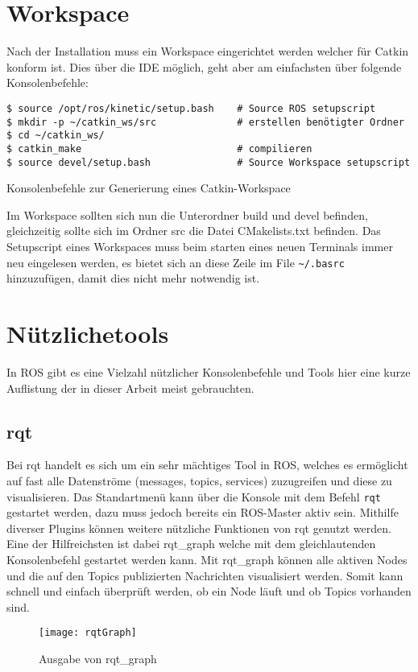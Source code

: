 \section{Workspace}
Nach der Installation muss ein Workspace eingerichtet werden welcher für Catkin konform ist. Dies über die \gls{IDE} möglich, geht aber am einfachsten über folgende Konsolenbefehle:
\begin{code}
	\begin{verbatim}
$ source /opt/ros/kinetic/setup.bash	# Source ROS setupscript
$ mkdir -p ~/catkin_ws/src				# erstellen benötigter Ordner	
$ cd ~/catkin_ws/
$ catkin_make							# compilieren
$ source devel/setup.bash				# Source Workspace setupscript
	\end{verbatim}
	\vspace{-15pt}
	\caption{Konsolenbefehle zur Generierung eines Catkin-Workspace}
	\label{code:catkinWS}
\end{code}
Im Workspace sollten sich nun die Unterordner build und devel befinden, gleichzeitig sollte sich im Ordner src die Datei CMakelists.txt befinden.
Das Setupscript eines Workspaces muss beim starten eines neuen Terminals immer neu eingelesen werden, es bietet sich an diese Zeile im File \verb|~/.basrc| hinzuzufügen, damit dies nicht mehr notwendig ist. 

\section{Nützlichetools}
In ROS gibt es eine Vielzahl nützlicher Konsolenbefehle und Tools hier eine kurze Auflistung der in dieser Arbeit meist gebrauchten.

\subsection{rqt}
Bei rqt handelt es sich um ein sehr mächtiges Tool in ROS, welches es ermöglicht auf fast alle Datenströme (messages, topics, services) zuzugreifen und diese zu visualisieren. Das Standartmenü kann über die Konsole mit dem Befehl \texttt{rqt} gestartet werden, dazu muss jedoch bereits ein ROS-Master aktiv sein. Mithilfe diverser Plugins können weitere nützliche Funktionen von rqt genutzt werden. Eine der Hilfreichsten ist dabei rqt\_graph welche mit dem gleichlautenden Konsolenbefehl gestartet werden kann. Mit rqt\_graph können alle aktiven Nodes und die auf den Topics publizierten Nachrichten visualisiert werden. Somit kann schnell und einfach überprüft werden, ob ein Node läuft und ob Topics vorhanden sind. 
\begin{figure}[h!]
	\centering
	\texttt{[image: rqtGraph]}
	\caption{Ausgabe von rqt\_graph}
	\label{fig:rqtGraph}
\end{figure}

